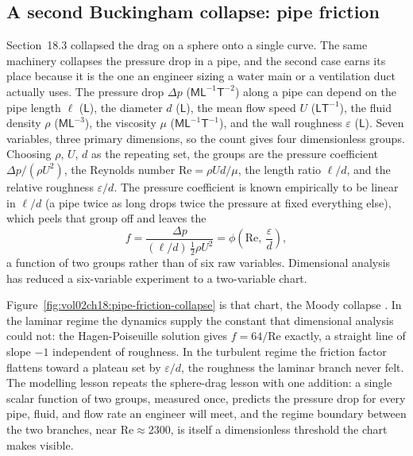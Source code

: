 \subsection{A second Buckingham collapse: pipe friction}

Section~18.3 collapsed the drag on a sphere onto a single curve. The same
machinery collapses the pressure drop in a pipe, and the second case earns
its place because it is the one an engineer sizing a water main or a
ventilation duct actually uses. The pressure drop $\Delta p$
($\mathsf{M}\mathsf{L}^{-1}\mathsf{T}^{-2}$) along a pipe can depend on the
pipe length $\ell$ ($\mathsf{L}$), the diameter $d$ ($\mathsf{L}$), the mean
flow speed $U$ ($\mathsf{L}\mathsf{T}^{-1}$), the fluid density $\rho$
($\mathsf{M}\mathsf{L}^{-3}$), the viscosity $\mu$
($\mathsf{M}\mathsf{L}^{-1}\mathsf{T}^{-1}$), and the wall roughness
$\varepsilon$ ($\mathsf{L}$). Seven variables, three primary dimensions, so
the count gives four dimensionless groups. Choosing $\rho$, $U$, $d$ as the
repeating set, the groups are the pressure coefficient
$\Delta p/(\rho U^2)$, the Reynolds number $\mathrm{Re} = \rho U d/\mu$, the
length ratio $\ell/d$, and the relative roughness $\varepsilon/d$. The
pressure coefficient is known empirically to be linear in $\ell/d$ (a pipe
twice as long drops twice the pressure at fixed everything else), which
peels that group off and leaves the 
\[
f = \frac{\Delta p}{(\ell/d)\,\tfrac{1}{2}\rho U^2}
  = \phi\!\left(\mathrm{Re},\ \frac{\varepsilon}{d}\right),
\]
a function of two groups rather than of six raw variables. Dimensional
analysis has reduced a six-variable experiment to a two-variable chart.

Figure~\ref{fig:vol02ch18:pipe-friction-collapse} is that chart, the Moody
collapse \cite{paper:moody-1944}. In the laminar regime the dynamics supply
the constant that dimensional analysis could not: the Hagen-Poiseuille
solution gives $f = 64/\mathrm{Re}$ exactly, a straight line of slope $-1$
independent of roughness. In the turbulent regime the friction factor
flattens toward a plateau set by $\varepsilon/d$, the roughness the laminar
branch never felt. The modelling lesson repeats the sphere-drag lesson with
one addition: a single scalar function of two groups, measured once,
predicts the pressure drop for every pipe, fluid, and flow rate an engineer
will meet, and the regime boundary between the two branches, near
$\mathrm{Re} \approx 2300$, is itself a dimensionless threshold the chart
makes visible.

